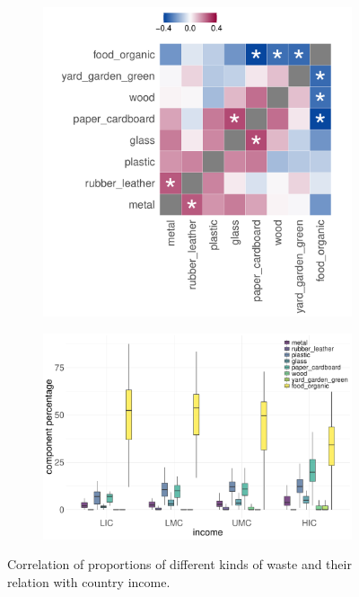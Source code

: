 \documentclass[dvipsnames]{article}
\begin{document}
\begin{figure}[htbp]
	\centering
	\begin{subfigure}{0.38\textwidth}
		\centering
		\includegraphics[width=\textwidth]{figures/components.pdf}	
		\label{subfig:heatmap_component}
	\end{subfigure}
	\begin{subfigure}{0.52\textwidth}
		\centering 
		\includegraphics[width=\textwidth]{figures/boxplot_component.pdf}
		\label{subfig:boxplot_component}
	\end{subfigure}
	\caption{\small Correlation of proportions of different kinds of waste and their relation with country income.}
	\label{fig:waste_component}
\end{figure}
\end{document}
